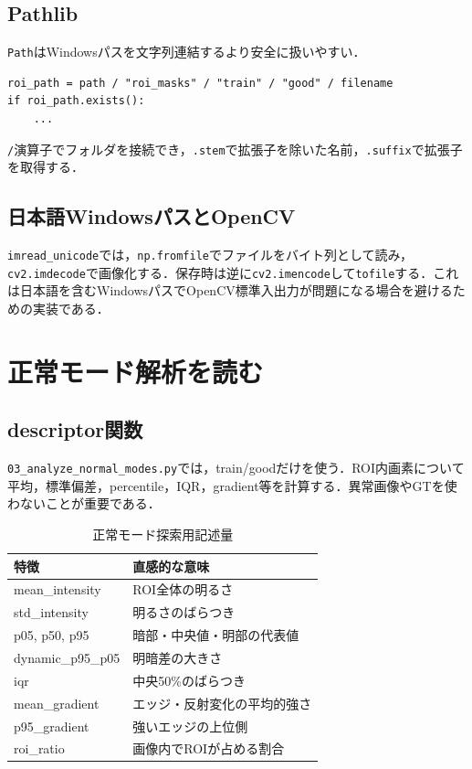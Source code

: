 \documentclass[a4paper,11pt]{ltjsreport}
\begin{document}
\section{Pathlib}
\texttt{Path}はWindowsパスを文字列連結するより安全に扱いやすい．

\begin{lstlisting}
roi_path = path / "roi_masks" / "train" / "good" / filename
if roi_path.exists():
    ...
\end{lstlisting}

\texttt{/}演算子でフォルダを接続でき，\texttt{.stem}で拡張子を除いた名前，\texttt{.suffix}で拡張子を取得する．

\section{日本語WindowsパスとOpenCV}
\texttt{imread\_unicode}では，\texttt{np.fromfile}でファイルをバイト列として読み，\texttt{cv2.imdecode}で画像化する．保存時は逆に\texttt{cv2.imencode}して\texttt{tofile}する．これは日本語を含むWindowsパスでOpenCV標準入出力が問題になる場合を避けるための実装である．

\chapter{正常モード解析を読む}

\section{descriptor関数}
\texttt{03\_analyze\_normal\_modes.py}では，train/goodだけを使う．ROI内画素について平均，標準偏差，percentile，IQR，gradient等を計算する．異常画像やGTを使わないことが重要である．

\begin{table}[H]
\centering
\caption{正常モード探索用記述量}
\begin{tabularx}{\linewidth}{L{45mm} Y}
\toprule
特徴 & 直感的な意味 \\
\midrule
mean\_intensity & ROI全体の明るさ \\
std\_intensity & 明るさのばらつき \\
p05, p50, p95 & 暗部・中央値・明部の代表値 \\
dynamic\_p95\_p05 & 明暗差の大きさ \\
iqr & 中央50\%のばらつき \\
mean\_gradient & エッジ・反射変化の平均的強さ \\
p95\_gradient & 強いエッジの上位側 \\
roi\_ratio & 画像内でROIが占める割合 \\
\bottomrule
\end{tabularx}
\end{table}
\end{document}
